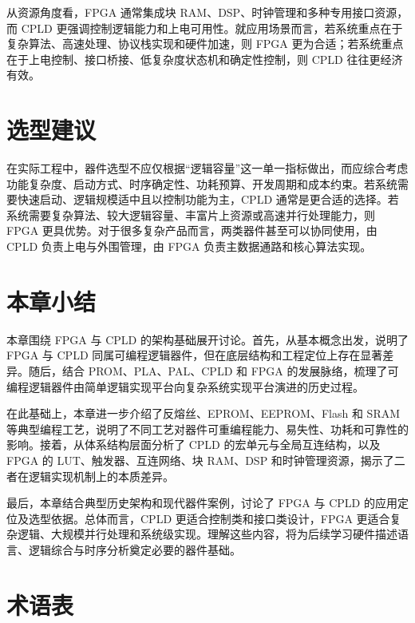 从资源角度看，FPGA 通常集成块 RAM、DSP、时钟管理和多种专用接口资源，而
CPLD
更强调控制逻辑能力和上电可用性。就应用场景而言，若系统重点在于复杂算法、高速处理、协议栈实现和硬件加速，则
FPGA
更为合适；若系统重点在于上电控制、接口桥接、低复杂度状态机和确定性控制，则
CPLD 往往更经济有效。

\section{选型建议}\label{ux9009ux578bux5efaux8bae}

在实际工程中，器件选型不应仅根据``逻辑容量''这一单一指标做出，而应综合考虑功能复杂度、启动方式、时序确定性、功耗预算、开发周期和成本约束。若系统需要快速启动、逻辑规模适中且以控制功能为主，CPLD
通常是更合适的选择。若系统需要复杂算法、较大逻辑容量、丰富片上资源或高速并行处理能力，则
FPGA 更具优势。对于很多复杂产品而言，两类器件甚至可以协同使用，由 CPLD
负责上电与外围管理，由 FPGA 负责主数据通路和核心算法实现。

\section{本章小结}\label{ux672cux7ae0ux5c0fux7ed3}

本章围绕 FPGA 与 CPLD 的架构基础展开讨论。首先，从基本概念出发，说明了
FPGA 与 CPLD
同属可编程逻辑器件，但在底层结构和工程定位上存在显著差异。随后，结合
PROM、PLA、PAL、CPLD 和 FPGA
的发展脉络，梳理了可编程逻辑器件由简单逻辑实现平台向复杂系统实现平台演进的历史过程。

在此基础上，本章进一步介绍了反熔丝、EPROM、EEPROM、Flash 和 SRAM
等典型编程工艺，说明了不同工艺对器件可重编程能力、易失性、功耗和可靠性的影响。接着，从体系结构层面分析了
CPLD 的宏单元与全局互连结构，以及 FPGA 的 LUT、触发器、互连网络、块
RAM、DSP 和时钟管理资源，揭示了二者在逻辑实现机制上的本质差异。

最后，本章结合典型历史架构和现代器件案例，讨论了 FPGA 与 CPLD
的应用定位及选型依据。总体而言，CPLD 更适合控制类和接口类设计，FPGA
更适合复杂逻辑、大规模并行处理和系统级实现。理解这些内容，将为后续学习硬件描述语言、逻辑综合与时序分析奠定必要的器件基础。

\section{术语表}\label{ux672fux8bedux8868}

